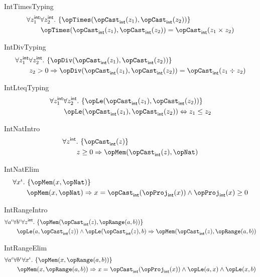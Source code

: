 \documentclass[11pt, a4paper, oneside]{article}
\begin{document}
\begin{axioms}
\item[IntTimesTyping] \[
        \begin{aligned}
            &\forall z_1^\int \forall z_2^\int.\, \st{ \opTimes(\opCast_\int(z_1), \opCast_\int(z_2)) } \\
            &\qquad \opTimes(\opCast_\int(z_1), \opCast_\int(z_2)) = \opCast_\int(z_1 \times z_2)
        \end{aligned}
    \]

\item[IntDivTyping] \[
        \begin{aligned}
            &\forall z_1^\int \forall z_2^\int.\, \st{ \opDiv(\opCast_\int(z_1), \opCast_\int(z_2)) } \\
            &\qquad z_2 > 0 \imp \opDiv(\opCast_\int(z_1), \opCast_\int(z_2)) = \opCast_\int(z_1 \div z_2)
        \end{aligned}
    \]

\item[IntLteqTyping] \[
        \begin{aligned}
            &\forall z_1^\int \forall z_2^\int.\, \st{ \opLe(\opCast_\int(z_1), \opCast_\int(z_2)) } \\
            &\qquad \opLe(\opCast_\int(z_1), \opCast_\int(z_2)) \eqv z_1 \le z_2
        \end{aligned}
    \]

\item[IntNatIntro] \[
        \begin{aligned}
            &\forall z^\int.\, \st{ \opCast_\int(z) } \\
            &\qquad z \ge 0 \imp \opMem(\opCast_\int(z), \opNat)
        \end{aligned}
    \]

\item[IntNatElim] \[
        \begin{aligned}
            &\forall x^\idv.\, \st{ \opMem(x, \opNat) } \\
            &\qquad \opMem(x, \opNat) \imp x = \opCast_\int(\opProj_\int(x)) \wedge \opProj_\int(x) \ge 0
        \end{aligned}
    \]

\item[IntRangeIntro] \[
        \begin{aligned}
            &\forall a^\idv \forall b^\idv \forall z^\int.\, \st{ \opMem(\opCast_\int(z), \opRange(a, b)) } \\
            &\qquad \opLe(a, \opCast_\int(z)) \wedge \opLe(\opCast_\int(z), b) \imp \opMem(\opCast_\int(z), \opRange(a, b))
        \end{aligned}
    \]

\item[IntRangeElim] \[
        \begin{aligned}
            &\forall a^\idv \forall b^\idv \forall x^\idv.\, \st{ \opMem(x, \opRange(a, b)) } \\
            &\qquad \opMem(x, \opRange(a, b)) \imp x = \opCast_\int(\opProj_\int(x)) \wedge \opLe(a, x) \wedge \opLe(x, b)
        \end{aligned}
    \]

\end{axioms}
\end{document}
